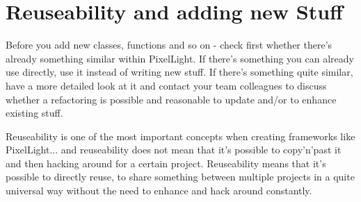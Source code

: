 \section{Reuseability and adding new Stuff}
Before you add new classes, functions and so on - check first whether there's already something similar within PixelLight. If there's something you can already use directly, use it instead of writing new stuff. If there's something quite similar, have a more detailed look at it and contact your team colleagues to discuss whether a refactoring is possible and reasonable to update and/or to enhance existing stuff.

Reuseability is one of the most important concepts when creating frameworks like PixelLight... and reuseability does not mean that it's possible to copy'n'past it and then hacking around for a certain project. Reuseability means that it's possible to directly reuse, to share something between multiple projects in a quite universal way without the need to enhance and hack around constantly.
